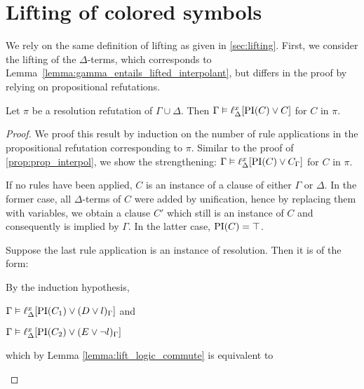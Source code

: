 \section{Lifting of colored symbols}

We rely on the same definition of lifting as given in \ref{sec:lifting}.
First, we consider the lifting of the $\Delta$-terms, which corresponds to Lemma~\ref{lemma:gamma_entails_lifted_interpolant}, but differs in the proof by relying on propositional refutations.\nopagebreak[4]

\begin{lemma}
	\label{lemma:gamma_entails_lifted_interpolantHuang}
	Let $\pi$ be a resolution refutation of $\Gamma \cup \Delta$. 
	Then $\Gamma \entails \lift{\Delta}{ \PI(C) \lor C }{x} $ for $C$ in $\pi$.
\end{lemma}
\begin{proof}
	We proof this result by induction on the number of rule applications in the propositional refutation corresponding to $\pi$. 
	Similar to the proof of \ref{prop:prop_interpol}, we show the strengthening:
	$\Gamma \entails \lift{\Delta}{ \PI(C) \lor C_\Gamma }{x} $ for $C$ in $\pi$.

	\begin{indproof}

			\newcommand{\lif}[1]{\lift{\Delta}{#1}{x}}

			If no rules have been applied, $C$ is an instance of a clause of either $\Gamma$ or $\Delta$.
			In the former case, all $\Delta$-terms of $C$ were added by unification, hence by replacing them with variables, we obtain a clause $C'$ which still is an instance of $C$ and consequently is implied by $\Gamma$. 
			In the latter case, $\PI(C) = \top$. 

		 Suppose the last rule application is an instance of resolution. Then it is of the form:
			\begin{prooftree}
			\end{prooftree}

			By the induction hypothesis,

			$\Gamma \entails \lift{\Delta}{ \PI(C_1) \lor (D \lor l)_\Gamma }{x}$ and

			$\Gamma \entails \lift{\Delta}{ \PI(C_2) \lor (E \lor \lnot l)_\Gamma }{x}$

			which by Lemma \ref{lemma:lift_logic_commute} is equivalent to


\end{indproof}
\end{proof}
